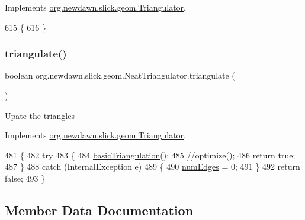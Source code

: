 Implements \mbox{\hyperlink{interfaceorg_1_1newdawn_1_1slick_1_1geom_1_1_triangulator_a0636d620daef98eab2ceb5bcf9dfaa9d}{org.\+newdawn.\+slick.\+geom.\+Triangulator}}.


\begin{DoxyCode}
615                             \{
616     \}
\end{DoxyCode}
\mbox{\label{classorg_1_1newdawn_1_1slick_1_1geom_1_1_neat_triangulator_a32227a64f0e7142d40d79a1adb3fdb24}} 
\subsubsection{\texorpdfstring{triangulate()}{triangulate()}}
{\footnotesize\ttfamily boolean org.\+newdawn.\+slick.\+geom.\+Neat\+Triangulator.\+triangulate (\begin{DoxyParamCaption}{ }\end{DoxyParamCaption})\hspace{0.3cm}{\ttfamily [inline]}}

Upate the triangles 

Implements \mbox{\hyperlink{interfaceorg_1_1newdawn_1_1slick_1_1geom_1_1_triangulator_a7c7ce8f59679b6c759a1e3d15ec4ee92}{org.\+newdawn.\+slick.\+geom.\+Triangulator}}.


\begin{DoxyCode}
481     \{
482         \textcolor{keywordflow}{try}
483         \{
484             \mbox{\hyperlink{classorg_1_1newdawn_1_1slick_1_1geom_1_1_neat_triangulator_ab1c1949c138da4b2c29a47c5326059e0}{basicTriangulation}}();
485             \textcolor{comment}{//optimize();}
486             \textcolor{keywordflow}{return} \textcolor{keyword}{true};
487         \}
488         \textcolor{keywordflow}{catch} (InternalException e)
489         \{
490             \mbox{\hyperlink{classorg_1_1newdawn_1_1slick_1_1geom_1_1_neat_triangulator_a4c9fba4faad072774b3b0fcbc7fd0fff}{numEdges}} = 0;
491         \}
492         \textcolor{keywordflow}{return} \textcolor{keyword}{false};
493     \}
\end{DoxyCode}


\subsection{Member Data Documentation}
\mbox{\label{classorg_1_1newdawn_1_1slick_1_1geom_1_1_neat_triangulator_a0abf260e1febb5ef0afc9894280f9efb}} 
